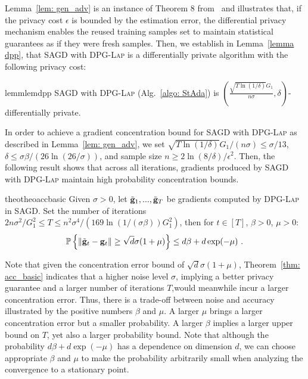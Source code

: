 \documentclass[11pt]{article}
\begin{document}
Lemma~\ref{lem: gen_adv} is an instance of Theorem 8 from~\cite{dwfe2015a} and illustrates that, if the privacy cost $\epsilon$ is bounded by the estimation error, the differential privacy mechanism enables the reused training samples set to maintain statistical guarantees as if they were fresh samples. 
Then, we establish in Lemma~\ref{lemma dpp}, that \textsc{SAGD} with \textsc{DPG-Lap} is a differentially private algorithm with the following privacy cost:
\begin{restatable}{lemm}{lemdpp}
\label{lemma dpp}
\textsc{SAGD} with \textsc{DPG-Lap} (Alg.~\ref{algo: StAda}) is $(\frac{\sqrt{T \ln(1/\delta)} G_1}{n\sigma}, \delta)$-differentially private. 
\end{restatable}  
In order to achieve a gradient concentration bound for \textsc{SAGD} with \textsc{DPG-Lap} as described in Lemma~\ref{lem: gen_adv}, we set $\sqrt{T \ln(1/\delta)} G_1/(n\sigma)\leq \sigma/13$, $\delta \leq \sigma \beta/(26 \ln(26/\sigma))$, and  sample size $n \geq 2\ln(8/\delta)/\epsilon^2$. 
Then, the following result shows that across all iterations, gradients produced by \textsc{SAGD} with \textsc{DPG-Lap} maintain high probability concentration bounds.

\begin{restatable}{theo}{theoaccbasic}
\label{thm: acc_basic}
Given $\sigma > 0$, let $\tilde {\mathbf{g}}_1,...,  \tilde {\mathbf{g}}_T$ be gradients computed by \textsc{DPG-Lap} in \textsc{SAGD}. Set the number of iterations $ 2n\sigma^2/G_1^2\leq T \leq n^2 \sigma^4/(169 \ln(1/(\sigma \beta))G_1^2)$, then for $t \in [T]$, $\beta >0$, $\mu > 0$:
    \begin{equation*}
    \mathbb{P}\left\{\|\tilde {\mathbf{g}}_t - \mathbf{g}_t\| \geq \sqrt{d}\sigma(1+\mu)\right\} \leq d\beta + d\exp(-\mu)~.
    \end{equation*}
\end{restatable}
Note that given the concentration error bound of $\sqrt{d}\sigma(1+\mu)$, Theorem~\ref{thm: acc_basic} indicates that a higher noise level $\sigma$, implying a better privacy guarantee and a larger number of iterations $T$,would meanwhile incur a larger concentration error.
Thus, there is a trade-off between noise and accuracy illustrated by the positive numbers $\beta$ and $\mu$.
A larger $\mu$ brings a larger concentration error but a smaller probability. 
A larger $\beta$ implies a larger upper bound on $T$, yet also a larger probability bound. 
Note that although the probability $d\beta + d\exp(-\mu)$ has a dependence on dimension $d$, we can choose appropriate $\beta$ and $\mu$ to make the probability arbitrarily small when analyzing the convergence to a stationary point.
\end{document}
